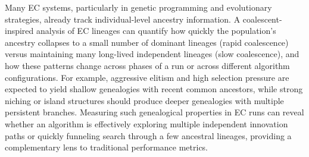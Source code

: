 Many EC systems, particularly in genetic programming and evolutionary strategies, already track individual-level ancestry information.
A coalescent-inspired analysis of EC lineages can quantify how quickly the population's ancestry collapses to a small number of dominant lineages (rapid coalescence) versus maintaining many long-lived independent lineages (slow coalescence), and how these patterns change across phases of a run or across different algorithm configurations.
For example, aggressive elitism and high selection pressure are expected to yield shallow genealogies with recent common ancestors, while strong niching or island structures should produce deeper genealogies with multiple persistent branches.
Measuring such genealogical properties in EC runs can reveal whether an algorithm is effectively exploring multiple independent innovation paths or quickly funneling search through a few ancestral lineages, providing a complementary lens to traditional performance metrics.












